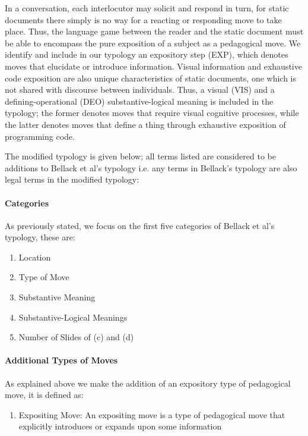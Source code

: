 \documentclass[conference]{IEEEtran}
\begin{document}
In a conversation, each interlocutor may solicit and respond in turn, for static
documents there simply is no way for a reacting or responding move to take
place. Thus, the language game between the reader and the static document must
be able to encompass the pure exposition of a subject as a pedagogical move. We
identify and include in our typology an expository step (EXP), which denotes
moves that elucidate or introduce information. Visual information and exhaustive
code exposition are also unique characteristics of static documents, one which
is not shared with discourse between individuals. Thus, a visual (VIS) and a
defining-operational (DEO) substantive-logical meaning is included in the
typology; the former denotes moves that require visual cognitive processes,
while the latter denotes moves that define a thing through exhaustive exposition
of programming code.

The modified typology is given below; all terms listed are considered to be additions to
Bellack et al's typology i.e. any terms in Bellack's typology are also
legal terms in the modified typology:

\paragraph{Categories}
As previously stated, we focus on the first five categories of Bellack et al's
typology, these are:
\begin{enumerate}
  \item Location
  \item Type of Move
  \item Substantive Meaning
  \item Substantive-Logical Meanings
  \item Number of Slides of (c) and (d)
\end{enumerate}

\paragraph{Additional Types of Moves}
As explained above we make the addition of an expository type of pedagogical
move, it is defined as:
\begin{enumerate}
  \item{Expositing Move:} An expositing move is a type of pedagogical move
  that explicitly introduces or expands upon some information
\end{enumerate}
\end{document}
